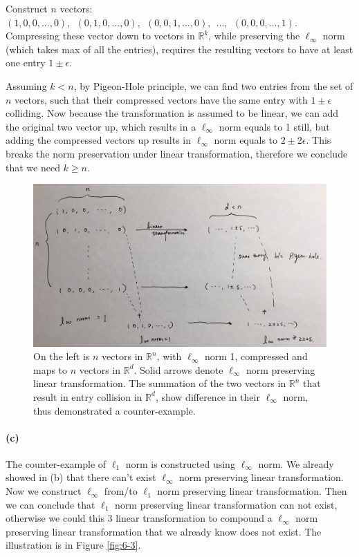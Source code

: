 \documentclass[12pt]{article}
\begin{document}
Construct $n$ vectors: $(1, 0, 0, ..., 0), \: \: (0, 1, 0, ..., 0), \: \: (0, 0, 1, ..., 0), \: \: ..., \: \: (0, 0, 0, ..., 1)$. Compressing these vector down to vectors in $\mathbb{R}^k$, while preserving the $\ell_\infty$ norm (which takes max of all the entries), requires the resulting vectors to have at least one entry $1 \pm \epsilon$. 

Assuming $k < n$, by Pigeon-Hole principle, we can find two entries from the set of $n$ vectors, such that their compressed vectors have the same entry with $1 \pm \epsilon$ colliding. Now because the transformation is assumed to be linear, we can add the original two vector up, which results in a $\ell_\infty$ norm equals to 1 still, but adding the compressed vectors up results in $\ell_\infty$ norm equals to $2 \pm 2\epsilon$. This breaks the norm preservation under linear transformation, therefore we conclude that we need $k \geq n$.

\begin{figure}
	\centering
	\includegraphics[width=1\textwidth]{6-b.jpg}
	\caption{On the left is $n$ vectors in $\mathbb{R}^n$, with $\ell_\infty$ norm 1, compressed and maps to $n$ vectors in $\mathbb{R}^d$. Solid arrows denote $\ell_\infty$ norm preserving linear transformation. The summation of the two vectors in $\mathbb{R}^n$ that result in entry collision in $\mathbb{R}^d$, show difference in their $\ell_\infty$ norm, thus demonstrated a counter-example.} \label{fig:6-2}
\end{figure}

\paragraph{(c)}
The counter-example of $\ell_1$ norm is constructed using $\ell_\infty$ norm. 
We already showed in (b) that there can't exist $\ell_\infty$ norm preserving linear transformation. Now we construct $\ell_\infty$ from/to $\ell_1$ norm preserving linear transformation. Then we can conclude that $\ell_1$ norm preserving linear transformation can not exist, otherwise we could this 3 linear transformation to compound a $\ell_\infty$ norm preserving linear transformation that we already know does not exist. The illustration is in Figure \ref{fig:6-3}. 
\end{document}
